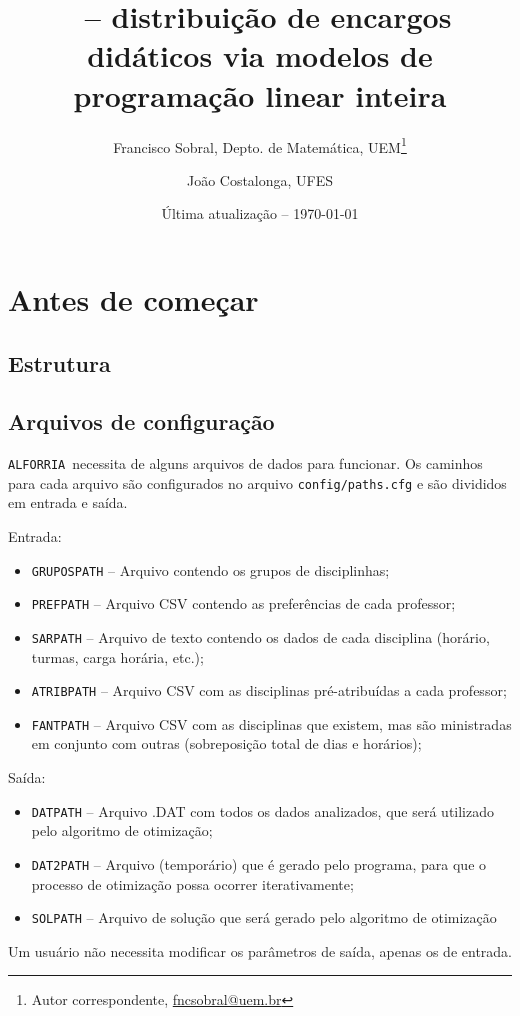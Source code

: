 \documentclass[a4paper, 12pt]{report}
\title{\alforria\ -- distribuição de encargos didáticos via
  modelos de programação linear inteira}
\author{Francisco Sobral, Depto. de Matemática, UEM\footnote{Autor
    correspondente, \url{fncsobral@uem.br}} \and João
  Costalonga, UFES}
\date{Última atualização -- \today}
\newcommand{\alforria}{\texttt{ALFORRIA}}
\newcommand{\ttt}[1]{\texttt{#1}}
\begin{document}
\maketitle

\chapter{Antes de começar}

\section{Estrutura}

\section{Arquivos de configuração}

\alforria\ necessita de alguns arquivos de dados para funcionar. Os
caminhos para cada arquivo são configurados no arquivo
\texttt{config/paths.cfg} e são divididos em entrada e saída.

Entrada:
\begin{itemize}
\item \ttt{GRUPOSPATH} -- Arquivo contendo os grupos de disciplinhas;
\item \ttt{PREFPATH} -- Arquivo CSV contendo as preferências de cada
  professor;
\item \ttt{SARPATH} -- Arquivo de texto contendo os dados de cada
  disciplina (horário, turmas, carga horária, etc.);
\item \ttt{ATRIBPATH} -- Arquivo CSV com as disciplinas pré-atribuídas
  a cada professor;
\item \ttt{FANTPATH} -- Arquivo CSV com as disciplinas que existem,
  mas são ministradas em conjunto com outras (sobreposição total de
  dias e horários);
\end{itemize}

Saída:
\begin{itemize}
\item \ttt{DATPATH} -- Arquivo .DAT com todos os dados analizados, que
  será utilizado pelo algoritmo de otimização;
\item \ttt{DAT2PATH} -- Arquivo (temporário) que é gerado pelo
  programa, para que o processo de otimização possa ocorrer
  iterativamente;
\item \ttt{SOLPATH} -- Arquivo de solução que será gerado pelo
  algoritmo de otimização
\end{itemize}
Um usuário não necessita modificar os parâmetros de saída, apenas os
de entrada.
\end{document}
